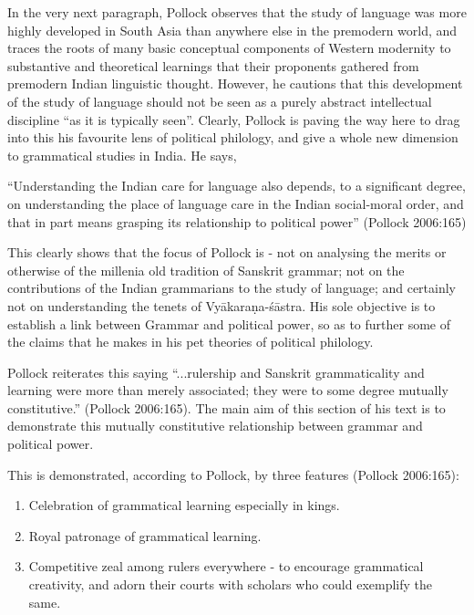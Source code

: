 In the very next paragraph, Pollock observes that the study of language was more highly developed in South Asia than anywhere else in the premodern world, and traces the roots of many basic conceptual components of Western modernity to substantive and theoretical learnings that their proponents gathered from premodern Indian linguistic thought. However, he cautions that this development of the study of language should not be seen as a purely abstract intellectual discipline ``as it is typically seen''. Clearly, Pollock is paving the way here to drag into this his favourite lens of political philology, and give a whole new dimension to grammatical studies in India. He says, 
\begin{myquote}
``Understanding the Indian care for language also depends, to a significant degree, on understanding the place of language care in the Indian social-moral order, and that in part means grasping its relationship to political power'' 
\hfill (Pollock 2006:165)
\end{myquote}

This clearly shows that the focus of Pollock is - not on analysing the merits or otherwise of the millenia old tradition of Sanskrit grammar; not on the contributions of the Indian grammarians to the study of language; and certainly not on understanding the tenets of Vyākaraṇa-śāstra. His sole objective is to establish a link between Grammar and political power, so as to further some of the claims that he makes in his pet theories of political philology.

Pollock reiterates this saying ``...rulership and Sanskrit grammaticality and learning were more than merely associated; they were to some degree mutually constitutive.'' (Pollock 2006:165). The main aim of this section of his text is to demonstrate this mutually constitutive relationship between grammar and political power.

This is demonstrated, according to Pollock, by three features (Pollock 2006:165):
\begin{enumerate}
\item Celebration of grammatical learning especially in kings.
\item Royal patronage of grammatical learning.
\item Competitive zeal among rulers everywhere - to encourage grammatical creativity, and adorn their courts with scholars who could exemplify the same. 
\end{enumerate}

